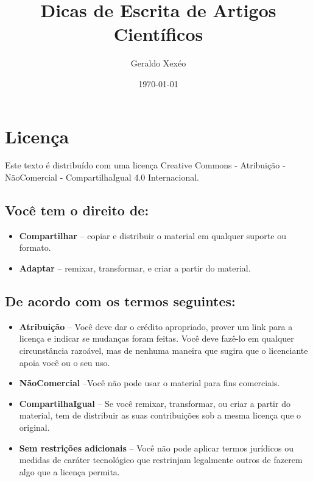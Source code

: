 \documentclass[openany]{book}
\title{Dicas de Escrita de Artigos Científicos}
\author{Geraldo Xexéo}
\date{\today}
\begin{document}
\frontmatter

\maketitle

\tableofcontents

\frontmatter

\chapter*{Licença}

\begin{center}
\ccbyncsa    

\vspace{1cm}

Este texto é distribuído com uma licença Creative Commons - Atribuição - NãoComercial - CompartilhaIgual 4.0 Internacional.

\end{center}






\section*{Você tem o direito de:}
\begin{itemize}
\item \textbf{Compartilhar} -- copiar e distribuir o material em qualquer suporte ou formato.
\item \textbf{Adaptar} -- remixar, transformar, e criar a partir do material.
\end{itemize}

\section*{De acordo com os termos seguintes:}
\begin{itemize}
\item \textbf{Atribuição} -- Você deve dar o crédito apropriado, prover um link para a licença e indicar se mudanças foram feitas. Você deve fazê-lo em qualquer circunstância razoável, mas de nenhuma maneira que sugira que o licenciante apoia você ou o seu uso.
\item \textbf{NãoComercial} --Você não pode usar o material para fins comerciais.
\item \textbf{CompartilhaIgual} -- Se você remixar, transformar, ou criar a partir do material, tem de distribuir as suas contribuições sob a mesma licença que o original.
\item \textbf{Sem restrições adicionais} -- Você não pode aplicar termos jurídicos ou medidas de caráter tecnológico que restrinjam legalmente outros de fazerem algo que a licença permita.
\end{itemize}
\end{document}
